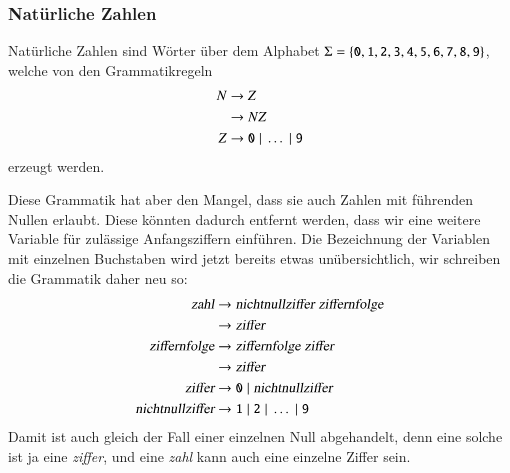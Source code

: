 \subsubsection{Natürliche Zahlen}
Natürliche Zahlen sind Wörter über dem Alphabet $\Sigma=\{
{\tt 0},
{\tt 1},
{\tt 2},
{\tt 3},
{\tt 4},
{\tt 5},
{\tt 6},
{\tt 7},
{\tt 8},
{\tt 9}\}$, welche von den Grammatikregeln
\begin{align*}
N&\to Z\\
 &\to NZ\\
Z&\to {\tt 0}\;|\;\dots \;|\;{\tt 9}
\end{align*}
erzeugt werden.

Diese Grammatik hat aber den Mangel, dass sie auch Zahlen
mit führenden Nullen erlaubt.
Diese könnten dadurch entfernt
werden, dass wir eine weitere Variable für zulässige
Anfangsziffern einführen.
Die Bezeichnung der Variablen mit einzelnen Buchstaben wird jetzt
bereits etwas unübersichtlich, wir schreiben die Grammatik daher neu
so:
\begin{align*}
\textsl{zahl}           &\to\textsl{nichtnullziffer}\; \textsl{ziffernfolge} \\
                        &\to\textsl{ziffer}\\
\textsl{ziffernfolge}   &\to \textsl{ziffernfolge}\; \textsl{ziffer}\\
                        &\to \textsl{ziffer}\\
\textsl{ziffer}         &\to \texttt{0}\; |\; \textsl{nichtnullziffer}\\
\textsl{nichtnullziffer}&\to \texttt{1}\;|\;\texttt{2}\;|\;\dots\;|\;\texttt{9}
\end{align*}
Damit ist auch gleich der Fall einer einzelnen Null abgehandelt, denn eine
solche ist ja eine \textsl{ziffer}, und eine \textsl{zahl} kann auch eine
einzelne Ziffer sein.

